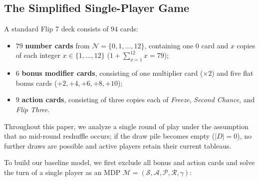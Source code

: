 \documentclass{article}
\theoremstyle{plain}
\theoremstyle{definition}
\theoremstyle{remark}
\begin{document}
\subsection{The Simplified Single-Player Game}
A standard Flip 7 deck consists of $94$ cards:
\begin{itemize}
    \item $79$ \textbf{number cards} from $\mathcal{N} = \{0, 1, \dots, 12\}$, containing one $0$ card and $x$ copies of each integer $x \in \{1, \dots, 12\}$ ($1 + \sum_{x=1}^{12} x = 79$);
    \item $6$ \textbf{bonus modifier cards}, consisting of one multiplier card ($\times 2$) and five flat bonus cards ($+2, +4, +6, +8, +10$);
    \item $9$ \textbf{action cards}, consisting of three copies each of \textit{Freeze}, \textit{Second Chance}, and \textit{Flip Three}.
\end{itemize}
Throughout this paper, we analyze a single round of play under the assumption that no mid-round reshuffle occurs; if the draw pile becomes empty ($|D| = 0$), no further draws are possible and active players retain their current tableaus.

To build our baseline model, we first exclude all bonus and action cards and solve the turn of a single player as an MDP $\mathcal{M} = (\mathcal{S}, \mathcal{A}, \mathcal{P}, \mathcal{R}, \gamma)$:
\end{document}
